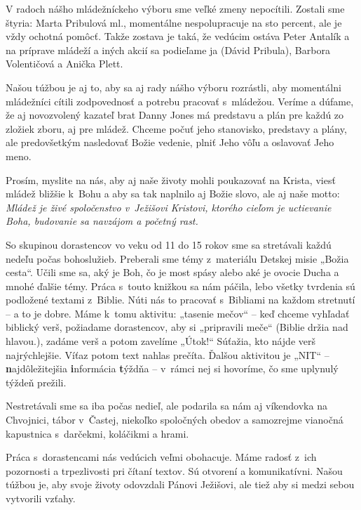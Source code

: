 V radoch nášho mládežníckeho výboru sme veľké zmeny nepocítili. Zostali sme štyria: Marta Pribulová ml., momentálne nespolupracuje na sto percent, ale je vždy ochotná pomôcť. Takže zostava je taká, že vedúcim ostáva Peter Antalík a na príprave mládeží a iných akcií sa podieľame ja (Dávid Pribula), Barbora Volentičová a Anička Plett.

Našou túžbou je aj to, aby sa aj rady nášho výboru rozrástli, aby momentálni mládežníci cítili zodpovednosť a potrebu pracovať s~mládežou. Veríme a dúfame, že aj novozvolený kazateľ brat Danny Jones má predstavu a plán pre každú zo zložiek zboru, aj pre mládež. Chceme počuť jeho stanovisko, predstavy a plány, ale predovšetkým nasledovať Božie vedenie, plniť Jeho vôľu a oslavovať Jeho meno.

Prosím, myslite na nás, aby aj naše životy mohli poukazovať na Krista, viesť mládež bližšie k~Bohu a aby sa tak naplnilo aj Božie slovo, ale aj naše motto:  {\it Mládež je živé spoločenstvo v~Ježišovi Kristovi, ktorého cieľom je uctievanie Boha, budovanie sa navzájom a početný rast.}



So skupinou dorastencov vo veku od 11 do 15 rokov sme sa stretávali každú nedeľu počas bohoslužieb. Preberali sme témy z~materiálu Detskej misie „Božia cesta“. Učili sme sa, aký je Boh, čo je most spásy alebo aké je ovocie Ducha a mnohé ďalšie témy. Práca s~touto knižkou sa nám páčila, lebo všetky tvrdenia sú podložené textami z~Biblie. Núti nás to pracovať s~Bibliami na každom stretnutí -- a to je dobre. Máme k~tomu aktivitu: „tasenie mečov“ -- keď chceme vyhľadať biblický verš, požiadame dorastencov, aby si „pripravili meče“ (Biblie držia nad hlavou.), zadáme verš a potom zavelíme „Útok!“ Súťažia, kto nájde verš najrýchlejšie. Víťaz potom  text nahlas prečíta. Ďalšou aktivitou je „NIT“ -- {\bf n}ajdôležitejšia {\bf i}nformácia {\bf t}ýždňa -- v~rámci nej si hovoríme, čo sme uplynulý týždeň prežili.

Nestretávali sme sa iba počas nedieľ, ale podarila sa nám aj víkendovka na Chvojnici, tábor v~Častej, niekoľko spoločných obedov a samozrejme vianočná kapustnica s~darčekmi, koláčikmi a hrami.

Práca s~dorastencami nás vedúcich veľmi obohacuje. Máme radosť z~ich pozornosti a trpezlivosti pri čítaní textov. Sú otvorení a komunikatívni. Našou túžbou je, aby svoje životy odovzdali Pánovi Ježišovi, ale tiež aby si medzi sebou vytvorili vzťahy.

